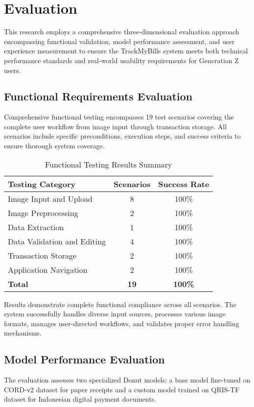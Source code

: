 \section{Evaluation}

This research employs a comprehensive three-dimensional evaluation approach encompassing functional validation, model performance assessment, and user experience measurement to ensure the TrackMyBills system meets both technical performance standards and real-world usability requirements for Generation Z users.

\subsection{Functional Requirements Evaluation}
Comprehensive functional testing encompasses 19 test scenarios covering the complete user workflow from image input through transaction storage. All scenarios include specific preconditions, execution steps, and success criteria to ensure thorough system coverage.

\begin{table}[htbp]
\centering
\caption{Functional Testing Results Summary}
\label{tab:functional-results}
\begin{tabular}{|l|c|c|}
\hline
\textbf{Testing Category} & \textbf{Scenarios} & \textbf{Success Rate} \\
\hline
Image Input and Upload & 8 & 100\% \\
Image Preprocessing & 2 & 100\% \\
Data Extraction & 1 & 100\% \\
Data Validation and Editing & 4 & 100\% \\
Transaction Storage & 2 & 100\% \\
Application Navigation & 2 & 100\% \\
\hline
\textbf{Total} & \textbf{19} & \textbf{100\%} \\
\hline
\end{tabular}
\end{table}

Results demonstrate complete functional compliance across all scenarios. The system successfully handles diverse input sources, processes various image formats, manages user-directed workflows, and validates proper error handling mechanisms.

\subsection{Model Performance Evaluation}
The evaluation assesses two specialized Donut models: a base model fine-tuned on CORD-v2 dataset for paper receipts and a custom model trained on QRIS-TF dataset for Indonesian digital payment documents.

